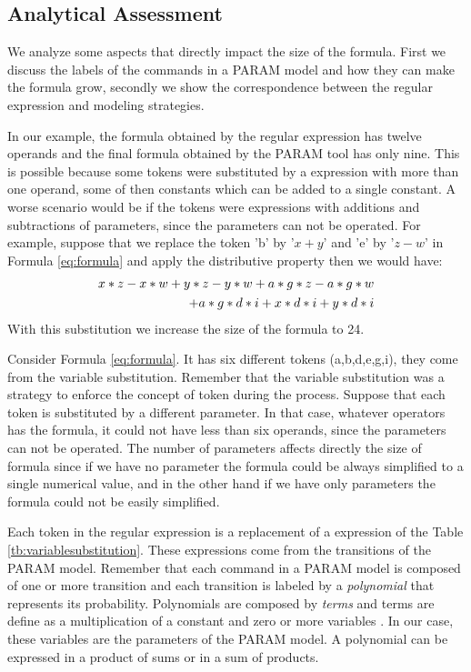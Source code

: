 \documentclass[conference]{IEEEtran}
\begin{document}
	\subsection{Analytical Assessment}	
	\label{sec:dfalabels}	
	
	We analyze some aspects that directly impact the size of the formula.
	First we discuss the labels of the commands in a PARAM model and how
	they can make the formula grow, secondly we show the correspondence
	between the regular expression and modeling strategies.
	
	In our example, the formula obtained by the regular expression
	has twelve operands and the final formula obtained by the PARAM tool
	has only nine. This is possible because some tokens were substituted
	by a expression with more than one operand, some of then constants 
	which can be added to a single constant.
	A worse scenario would	 be if the tokens were 	expressions with 
	additions and subtractions of parameters, since the parameters can
	not be operated. For example,
	suppose 
	that we replace the token 'b' by '$x+y$' and 'e' by '$z-w$' in
	Formula \ref{eq:formula} and apply the distributive property then we would have:			
	\begin{equation}	
	\small
	\begin{split}
		x*z-x*w+y*z-y*w+a*g*z-a*g*w\\
		+a*g*d*i + x*d*i+y*d*i
	\end{split}
	\end{equation}	
	With this substitution we increase the size of the formula to 24.
		
		 Consider 
	Formula \ref{eq:formula}. It has six different tokens (a,b,d,e,g,i),
	they come from the variable substitution. Remember that the variable
	substitution was a strategy to enforce the concept of token during
	the process. Suppose that each token is substituted by a different
	parameter. In that case, whatever operators has the formula,  it could not have
	less than six operands, since the parameters can not be operated.
	The number of parameters affects directly the size of formula since if we have no parameter
	the formula could be always simplified to a single numerical value, and in the other
	hand if we have only parameters the formula could not be easily simplified.
	
	Each token in the regular expression is a replacement
	of a expression of the Table \ref{tb:variablesubstitution}. These
	expressions come from the transitions of the PARAM model.
	Remember that each command in a PARAM model is composed of one or more transition
	and each transition is labeled by a \textit{polynomial} that represents its
	probability. Polynomials are composed by \textit{terms} and terms 
	are define as a multiplication of a constant and zero or more variables \cite{greuel}.
	In our case, these variables are the parameters of the PARAM model. 
	A polynomial can be expressed in a product of sums or in a sum of products.
	
\end{document}
